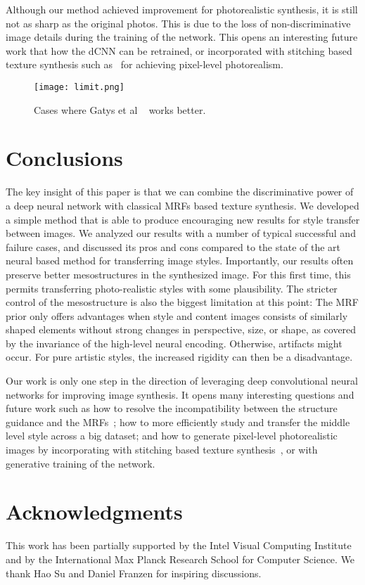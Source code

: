 \documentclass[10pt,twocolumn,letterpaper]{article}
\begin{document}
Although our method achieved improvement for photorealistic synthesis, it is still not as sharp as the original photos. This is due to the loss of non-discriminative image details during the training of the network. This opens an interesting future work that how the dCNN can be retrained, or incorporated with stitching based texture synthesis such as~\cite{Kwatra03} for achieving pixel-level photorealism.

\begin{figure}[t]
	\centering
	\texttt{[image: limit.png]}
	\caption{Cases where Gatys et al ~\cite{Gatys15} works better.}\label{fig:limit}
\end{figure}

\section{Conclusions}
The key insight of this paper is that we can combine the discriminative power of a deep neural network with classical MRFs based texture synthesis. We developed a simple method that is able to produce encouraging new results for style transfer between images. We analyzed our results with a number of typical successful and failure cases, and discussed its pros and cons compared to the state of the art neural based method for transferring image styles. Importantly, our results often preserve better mesostructures in the synthesized image. For this first time, this permits transferring photo-realistic styles with some plausibility. The stricter control of the mesostructure is also the biggest limitation at this point: The MRF prior only offers advantages when style and content images consists of similarly shaped elements without strong changes in perspective, size, or shape, as covered by the invariance of the high-level neural encoding. Otherwise, artifacts might occur. For pure artistic styles, the increased rigidity can then be a disadvantage.

Our work is only one step in the direction of leveraging deep convolutional neural networks for improving image synthesis. It opens many interesting questions and future work such as how to resolve the incompatibility between the structure guidance and the MRFs~\cite{He12}; how to more efficiently study and transfer the middle level style across a big dataset; and how to generate pixel-level photorealistic images by incorporating with stitching based texture synthesis~\cite{Kwatra03}, or with generative training of the network.


\section*{Acknowledgments}
This work has been partially supported by the Intel Visual Computing Institute and by the International Max Planck Research School for Computer Science. We thank Hao Su and Daniel Franzen for inspiring discussions.

{\small


}
\end{document}
